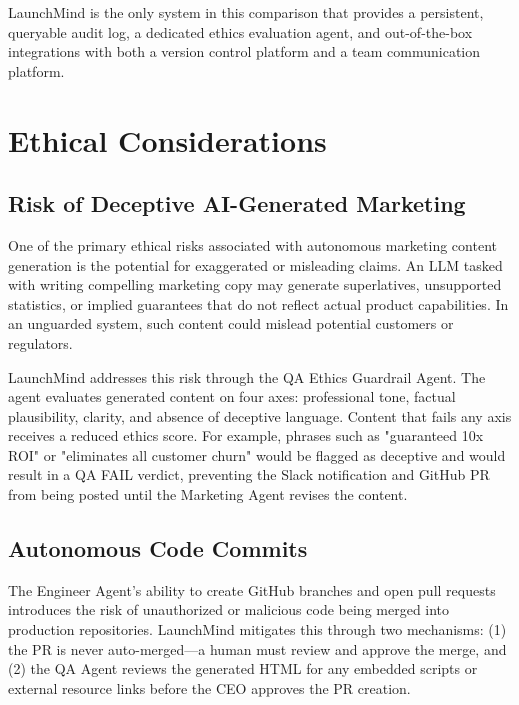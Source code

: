 \documentclass[conference]{IEEEtran}
\begin{document}
LaunchMind is the only system in this comparison that provides a persistent, queryable audit log, a dedicated ethics evaluation agent, and out-of-the-box integrations with both a version control platform and a team communication platform.

\section{Ethical Considerations}
\label{sec:ethics}

\subsection{Risk of Deceptive AI-Generated Marketing}

One of the primary ethical risks associated with autonomous marketing content generation is the potential for exaggerated or misleading claims. An LLM tasked with writing compelling marketing copy may generate superlatives, unsupported statistics, or implied guarantees that do not reflect actual product capabilities. In an unguarded system, such content could mislead potential customers or regulators.

LaunchMind addresses this risk through the QA Ethics Guardrail Agent. The agent evaluates generated content on four axes: professional tone, factual plausibility, clarity, and absence of deceptive language. Content that fails any axis receives a reduced ethics score. For example, phrases such as "guaranteed 10x ROI" or "eliminates all customer churn" would be flagged as deceptive and would result in a QA FAIL verdict, preventing the Slack notification and GitHub PR from being posted until the Marketing Agent revises the content.

\subsection{Autonomous Code Commits}

The Engineer Agent's ability to create GitHub branches and open pull requests introduces the risk of unauthorized or malicious code being merged into production repositories. LaunchMind mitigates this through two mechanisms: (1) the PR is never auto-merged—a human must review and approve the merge, and (2) the QA Agent reviews the generated HTML for any embedded scripts or external resource links before the CEO approves the PR creation.
\end{document}
